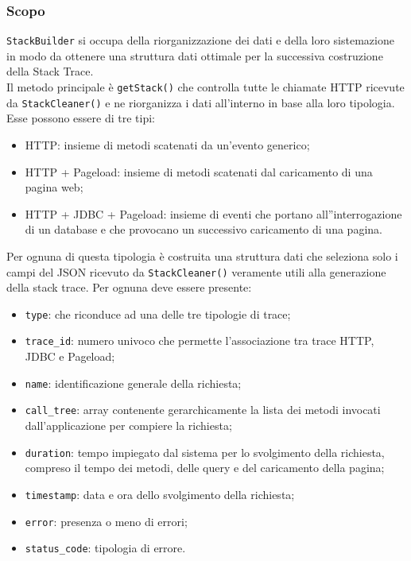 	\subsubsection{Scopo}
	\texttt{StackBuilder} si occupa della riorganizzazione dei dati e della loro sistemazione in modo da ottenere una struttura dati ottimale per la successiva costruzione della Stack Trace.\\
	Il metodo principale è \texttt{getStack()} che controlla tutte le chiamate HTTP ricevute da \texttt{StackCleaner()} e ne riorganizza i dati all'interno in base alla loro tipologia. Esse possono essere di tre tipi:
	\begin{itemize}
		\item HTTP: insieme di metodi scatenati da un'evento generico;
		\item HTTP + Pageload: insieme di metodi scatenati dal caricamento di una pagina web;
		\item HTTP + JDBC + Pageload: insieme di eventi che portano all''interrogazione di un database e che provocano un successivo caricamento di una pagina.
	\end{itemize}
	Per ognuna di questa tipologia è costruita una struttura dati che seleziona solo i campi del JSON ricevuto da \texttt{StackCleaner()} veramente utili alla generazione della stack trace. Per ognuna deve essere presente:
	\begin{itemize}
		\item \texttt{type}: che riconduce ad una delle tre tipologie di trace;
		\item \texttt{trace\_id}: numero univoco che permette l'associazione tra trace HTTP, JDBC e Pageload;
		\item \texttt{name}: identificazione generale della richiesta;
		\item \texttt{call\_tree}: array contenente gerarchicamente la lista dei metodi invocati dall'applicazione per compiere la richiesta;
		\item \texttt{duration}: tempo impiegato dal sistema per lo svolgimento della richiesta, compreso il tempo dei metodi, delle query e del caricamento della pagina;
		\item \texttt{timestamp}: data e ora dello svolgimento della richiesta;
		\item \texttt{error}: presenza o meno di errori;
		\item \texttt{status\_code}: tipologia di errore.
	\end{itemize}
